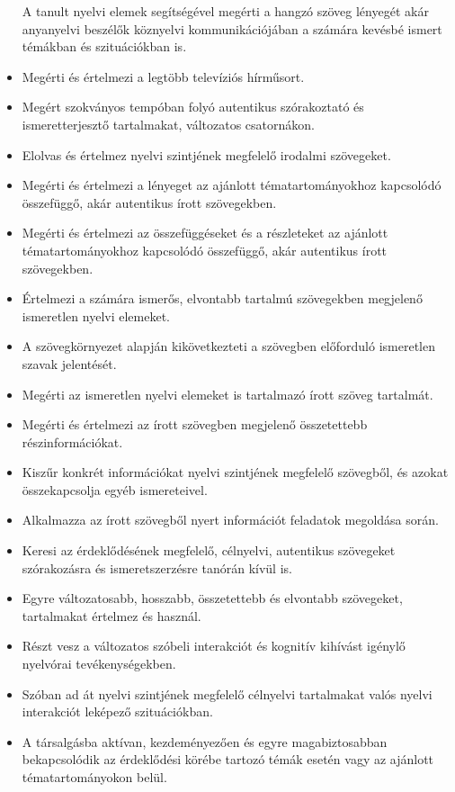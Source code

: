 \begin{itemize}
  A tanult nyelvi elemek segítségével megérti a hangzó szöveg lényegét
  akár anyanyelvi beszélők köznyelvi kommunikációjában a számára kevésbé
  ismert témákban és szituációkban is.
\item
  Megérti és értelmezi a legtöbb televíziós hírműsort.
\item
  Megért szokványos tempóban folyó autentikus szórakoztató és
  ismeretterjesztő tartalmakat, változatos csatornákon.
\item
  Elolvas és értelmez nyelvi szintjének megfelelő irodalmi szövegeket.
\item
  Megérti és értelmezi a lényeget az ajánlott tématartományokhoz
  kapcsolódó összefüggő, akár autentikus írott szövegekben.
\item
  Megérti és értelmezi az összefüggéseket és a részleteket az ajánlott
  tématartományokhoz kapcsolódó összefüggő, akár autentikus írott
  szövegekben.
\item
  Értelmezi a számára ismerős, elvontabb tartalmú szövegekben megjelenő
  ismeretlen nyelvi elemeket.
\item
  A szövegkörnyezet alapján kikövetkezteti a szövegben előforduló
  ismeretlen szavak jelentését.
\item
  Megérti az ismeretlen nyelvi elemeket is tartalmazó írott szöveg
  tartalmát.
\item
  Megérti és értelmezi az írott szövegben megjelenő összetettebb
  részinformációkat.
\item
  Kiszűr konkrét információkat nyelvi szintjének megfelelő szövegből, és
  azokat összekapcsolja egyéb ismereteivel.
\item
  Alkalmazza az írott szövegből nyert információt feladatok megoldása
  során.
\item
  Keresi az érdeklődésének megfelelő, célnyelvi, autentikus szövegeket
  szórakozásra és ismeretszerzésre tanórán kívül is.
\item
  Egyre változatosabb, hosszabb, összetettebb és elvontabb szövegeket,
  tartalmakat értelmez és használ.
\item
  Részt vesz a változatos szóbeli interakciót és kognitív kihívást
  igénylő nyelvórai tevékenységekben.
\item
  Szóban ad át nyelvi szintjének megfelelő célnyelvi tartalmakat valós
  nyelvi interakciót leképező szituációkban.
\item
  A társalgásba aktívan, kezdeményezően és egyre magabiztosabban
  bekapcsolódik az érdeklődési körébe tartozó témák esetén vagy az
  ajánlott tématartományokon belül.

\end{itemize}
